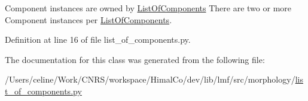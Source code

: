 Component instances are owned by \hyperlink{classlmf_1_1src_1_1morphology_1_1list__of__components_1_1_list_of_components}{List\+Of\+Components} There are two or more Component instances per \hyperlink{classlmf_1_1src_1_1morphology_1_1list__of__components_1_1_list_of_components}{List\+Of\+Components}. 



Definition at line 16 of file list\+\_\+of\+\_\+components.\+py.



The documentation for this class was generated from the following file\+:\begin{DoxyCompactItemize}
\item 
/\+Users/celine/\+Work/\+C\+N\+R\+S/workspace/\+Himal\+Co/dev/lib/lmf/src/morphology/\hyperlink{list__of__components_8py}{list\+\_\+of\+\_\+components.\+py}\end{DoxyCompactItemize}
